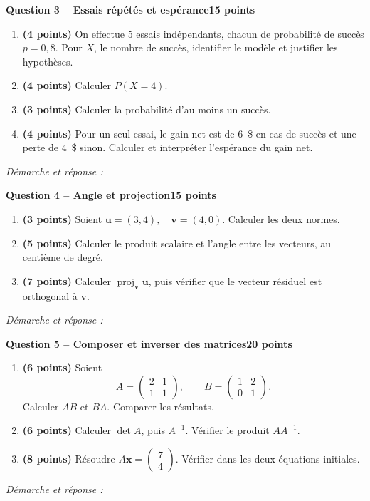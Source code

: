 \documentclass[11pt,a4paper]{article}
\begin{document}
\newpage
{\large\bfseries Question 3 -- Essais répétés et espérance}\hfill\textbf{15 points}\par
\begin{enumerate}
\item \textbf{(4 points)} On effectue 5 essais indépendants, chacun de probabilité de succès \(p=0{,}8\). Pour \(X\), le nombre de succès, identifier le modèle et justifier les hypothèses.
\item \textbf{(4 points)} Calculer \(P(X=4)\).
\item \textbf{(3 points)} Calculer la probabilité d’au moins un succès.
\item \textbf{(4 points)} Pour un seul essai, le gain net est de 6~\$ en cas de succès et une perte de 4~\$ sinon. Calculer et interpréter l’espérance du gain net.
\end{enumerate}
\vspace{3mm}\textit{Démarche et réponse :}\par\vfill

\newpage
{\large\bfseries Question 4 -- Angle et projection}\hfill\textbf{15 points}\par
\begin{enumerate}
\item \textbf{(3 points)} Soient \(\mathbf u=(3,4),\quad\mathbf v=(4,0)\). Calculer les deux normes.
\item \textbf{(5 points)} Calculer le produit scalaire et l’angle entre les vecteurs, au centième de degré.
\item \textbf{(7 points)} Calculer \(\operatorname{proj}_{\mathbf v}\mathbf u\), puis vérifier que le vecteur résiduel est orthogonal à \(\mathbf v\).
\end{enumerate}
\vspace{3mm}\textit{Démarche et réponse :}\par\vfill

\newpage
{\large\bfseries Question 5 -- Composer et inverser des matrices}\hfill\textbf{20 points}\par
\begin{enumerate}
\item \textbf{(6 points)} Soient \[A=\begin{pmatrix}2 & 1\\1 & 1\end{pmatrix},\qquad B=\begin{pmatrix}1 & 2\\0 & 1\end{pmatrix}.\] Calculer \(AB\) et \(BA\). Comparer les résultats.
\item \textbf{(6 points)} Calculer \(\det A\), puis \(A^{-1}\). Vérifier le produit \(AA^{-1}\).
\item \textbf{(8 points)} Résoudre \(A\mathbf x=\begin{pmatrix}7\\4\end{pmatrix}\). Vérifier dans les deux équations initiales.
\end{enumerate}
\vspace{3mm}\textit{Démarche et réponse :}\par\vfill
\end{document}
